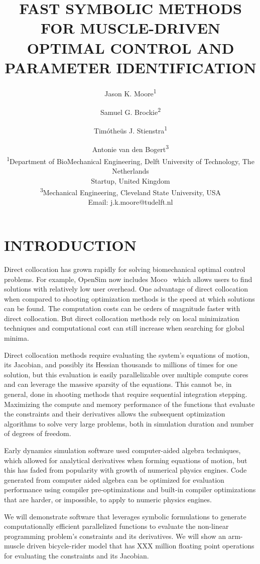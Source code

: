 \documentclass[11pt,twocolumn]{article}
\title{\textbf{
  FAST SYMBOLIC METHODS FOR MUSCLE-DRIVEN\\
  OPTIMAL CONTROL AND PARAMETER IDENTIFICATION
}}
\author{
Jason K. Moore\textsuperscript{1}\and
Samuel G. Brockie\textsuperscript{2}\and
Timótheüs J. Stienstra\textsuperscript{1}\and
Antonie van den Bogert\textsuperscript{3}\\
\textsuperscript{1}Department of BioMechanical Engineering, Delft University of Technology, The Netherlands\\
Startup, United Kingdom\\
\textsuperscript{3}Mechanical Engineering, Cleveland State University, USA\\
Email: j.k.moore@tudelft.nl}
\date{}
\begin{document}
\pagestyle{fancy}
\lhead{}
\maketitle
\section*{INTRODUCTION}
%
Direct collocation has grown rapidly for solving biomechanical optimal control
problems. For example, OpenSim now includes Moco~\cite{Dembia2019} which allows
users to find solutions with relatively low user overhead. One advantage of
direct collocation when compared to shooting optimization methods is the speed
at which solutions can be found. The computation costs can be orders of
magnitude faster with direct collocation. But direct collocation methods rely on
local minimization techniques and computational cost can still increase when
searching for global minima.

Direct collocation methods require evaluating the system's equations of motion,
its Jacobian, and possibly its Hessian thousands to millions of times for one
solution, but this evaluation is easily parallelizable over multiple compute
cores and can leverage the massive sparsity of the equations. This cannot be, in
general, done in shooting methods that require sequential integration stepping.
Maximizing the compute and memory performance of the functions that evaluate the
constraints and their derivatives allows the subsequent optimization algorithms
to solve very large problems, both in simulation duration and number of degrees
of freedom.

Early dynamics simulation software used computer-aided algebra techniques, which
allowed for analytical derivatives when forming equations of motion, but this
has faded from popularity with growth of numerical physics engines. Code
generated from computer aided algebra can be optimized for evaluation
performance using compiler pre-optimizations and built-in compiler optimizations
that are harder, or impossible, to apply to numeric physics engines.

We will demonstrate software that leverages symbolic formulations to generate
computationally efficient parallelized functions to evaluate the non-linear
programming problem's constraints and its derivatives. We will show an
arm-muscle driven bicycle-rider model that has XXX million floating point
operations for evaluating the constraints and its Jacobian.
\end{document}
